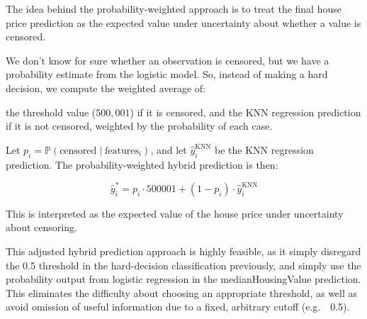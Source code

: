 \documentclass[
]{article}
\begin{document}
The idea behind the probability-weighted approach is to treat the final
house price prediction as the expected value under uncertainty about
whether a value is censored.

We don't know for sure whether an observation is censored, but we have a
probability estimate from the logistic model. So, instead of making a
hard decision, we compute the weighted average of:

the threshold value (\(500{,}001\)) if it is censored, and the KNN
regression prediction if it is not censored, weighted by the probability
of each case.

Let \(p_i = \mathbb{P}(\text{censored} \mid \text{features}_i)\), and
let \(\hat{y}_i^{\text{KNN}}\) be the KNN regression prediction. The
probability-weighted hybrid prediction is then:

\[
\hat{y}^*_i = p_i \cdot 500001 + (1 - p_i) \cdot \hat{y}_i^{\text{KNN}}
\]

This is interpreted as the expected value of the house price under
uncertainty about censoring.

This adjusted hybrid prediction approach is highly feasible, as it
simply disregard the 0.5 threshold in the hard-decision classification
previously, and simply use the probability output from logistic
regression in the medianHousingValue prediction. This eliminates the
difficulty about choosing an appropriate threshold, as well as avoid
omission of useful information due to a fixed, arbitrary cutoff
(e.g.~~0.5).
\end{document}
